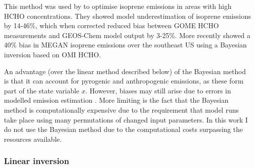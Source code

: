       This method was used by \textcite{Shim2005} to optimise isoprene emissions in areas with high HCHO concentrations. 
      They showed model underestimation of isoprene emissions by 14-46\%, which when corrected reduced bias between GOME HCHO measurements and GEOS-Chem model output by 3-25\%.
      More recently \textcite{Kaiser2018} showed a 40\% bias in MEGAN isoprene emissions over the southeast US using a Bayesian inversion based on OMI HCHO.
      
      An advantage (over the linear method described below) of the Bayesian method is that it can account for pyrogenic and anthropogenic emissions, as these form part of the state variable $x$.
      However, biases may still arise due to errors in modelled emission estimation \parencite{Curci2010}.
      More limiting is the fact that the Bayesian method is computationally expensive due to the requirement that model runs take place using many permutations of changed input parameters.
      In this work I do not use the Bayesian method due to the computational costs surpassing the resources available.
      
    \subsubsection{Linear inversion}
      \label{BioIsop:intro:top_down_linear}
      
